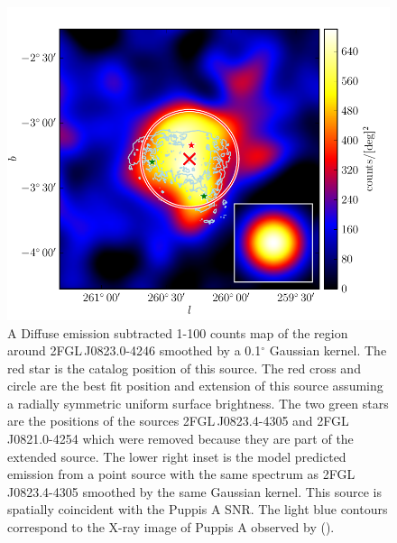 \documentclass[12pt,preprint]{aastex}
\newcommand{\gev}{\text{GeV}\xspace}
\newcommand{\rosat}{\text{{\em ROSAT}}\xspace}
\renewcommand{\deg}{\ensuremath{^\circ}\xspace}
\begin{document}
\begin{figure}
  \begin{center}
    \includegraphics[type=pdf,ext=.pdf,read=.pdf]{source_plots/source_1FGL_J0823.3-4248}
  \end{center}
  \caption{A Diffuse emission subtracted 1-100
  \gev counts map of the region around 2FGL\,J0823.0-4246 smoothed
  by a 0.1\deg Gaussian kernel.  The red star is the catalog position
  of this source.  The red cross and circle are the best fit position
  and extension of this source assuming a radially symmetric uniform
  surface brightness.  The two green stars are the positions of the
  sources 2FGL\,J0823.4-4305 and 2FGL\,J0821.0-4254 which were removed
  because they are part of the extended source.  The lower right inset
  is the model predicted emission from a point source with the same
  spectrum as 2FGL\,J0823.4-4305 smoothed by the same Gaussian kernel.
  This source is spatially coincident with the Puppis A SNR. The
  light blue contours correspond to the X-ray image of Puppis A observed by 
  \rosat
  (\cite{rosat_puppis_a}). 
  }\label{1FGL_J0823.3-4248}
\end{figure}
\end{document}
